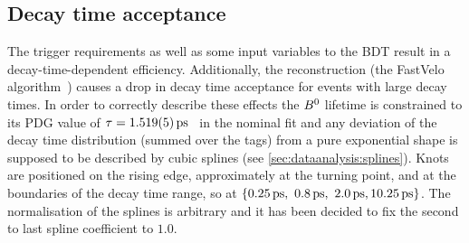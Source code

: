 \subsection{Decay time acceptance}
\label{sec:decaytimefit:acceptance}

The trigger requirements as well as some input variables to the BDT result in
a decay-time-dependent efficiency. Additionally, the \velo reconstruction
(\ie the FastVelo algorithm~\cite{Callot:2011bza}) causes a drop in decay time
acceptance for events with large decay times. In order to correctly describe
these effects the ${{B}^0}$ lifetime is constrained to its PDG value of $\tau =
\SI{1.519\pm0.005}{\ps}$~\cite{PDG2014} in the nominal fit and any deviation
of the decay time distribution (summed over the tags) from a pure exponential
shape is supposed to be described by cubic splines (see
\cref{sec:dataanalysis:splines}). Knots are positioned on the rising edge,
approximately at the turning point, and at the boundaries of the decay time
range, so at $\{\SIlist[list-final-separator={,
}]{0.25;0.8;2.0;10.25}{\ps}\}$. The normalisation of the splines is arbitrary
and it has been decided to fix the second to last spline coefficient to
$\num{1.0}$.

